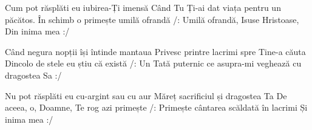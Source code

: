 

\beginverse
Cum pot răsplăti eu iubirea-Ți imensă
Când Tu Ți-ai dat viața pentru un păcătos.
În schimb o primește umilă ofrandă
/: Umilă ofrandă, Isuse Hristoase,
Din inima mea :/
\endverse

\beginverse
Când negura nopții își întinde mantaua
Privesc printre lacrimi spre Tine-a căuta
Dincolo de stele eu știu că există
/: Un Tată puternic ce asupra-mi veghează cu dragostea Sa :/
\endverse

\beginverse
Nu pot răsplăti eu cu-argint sau cu aur
Măreț sacrificiul și dragostea Ta
De aceea, o, Doamne, Te rog azi primește
/: Primește cântarea scăldată în lacrimi
Și inima mea :/
\endverse

\endsong
